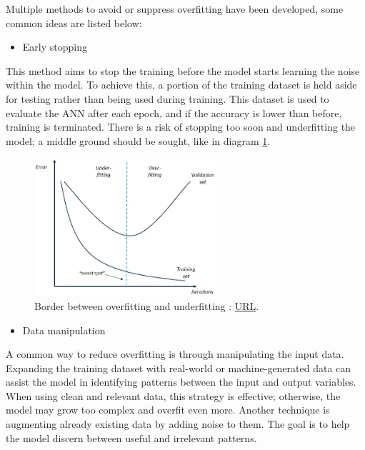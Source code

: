 Multiple methods to avoid or suppress overfitting have been developed, some common ideas are listed below:
\begin{itemize}
    \item Early stopping
\end{itemize}
This method aims to stop the training before the model starts learning the noise within the model. To achieve this, a portion of the training dataset is held aside for testing rather than being used during training. This dataset is used to evaluate the ANN after each epoch, and if the accuracy is lower than before, training is terminated. There is a risk of stopping too soon and underfitting the model; a middle ground should be sought, like in diagram \ref{fig:Model Overfitting/Underfitting}.
\begin{figure}[H]
    \centering
        \includegraphics[width=0.6\textwidth]{Images/diagrams/classic_overfitting.png}
        \decoRule
        \caption[Overfitting/Underfitting]{Border between overfitting and underfitting \cite{IBM_overfitting}: \href{https://www.ibm.com/cloud/learn/overfitting}{URL}.}
        \label{fig:Model Overfitting/Underfitting}
\end{figure}

\begin{itemize}[resume]
    \item Data manipulation
\end{itemize}
A common way to reduce overfitting is through manipulating the input data. Expanding the training dataset with real-world or machine-generated data can assist the model in identifying patterns between the input and output variables. When using clean and relevant data, this strategy is effective; otherwise, the model may grow too complex and overfit even more. Another technique is augmenting already existing data by adding noise to them. The goal is to help the model discern between useful and irrelevant patterns.

